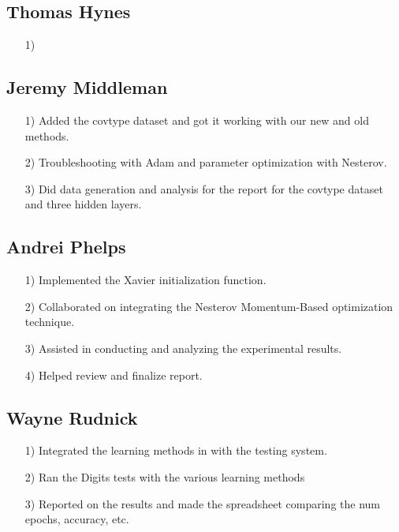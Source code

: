 \documentclass{article}
\begin{document}
\subsection*{Thomas Hynes}
\begin{itemize}
    \item[1)] 
\end{itemize}

\subsection*{Jeremy Middleman}
\begin{itemize}
    \item[1)] Added the covtype dataset and got it working with our new and old methods.
    \item[2)] Troubleshooting with Adam and parameter optimization with Nesterov.
    \item[3)] Did data generation and analysis for the report for the covtype dataset and three hidden layers.
\end{itemize}

\subsection*{Andrei Phelps}
\begin{itemize}
    \item[1)] Implemented the Xavier initialization function.
    \item[2)] Collaborated on integrating the Nesterov Momentum-Based optimization technique.
    \item[3)] Assisted in conducting and analyzing the experimental results.
    \item[4)] Helped review and finalize report.
\end{itemize}

\subsection*{Wayne Rudnick}
\begin{itemize}
    \item[1)] Integrated the learning methods in with the testing system.
    \item[2)] Ran the Digits tests with the various learning methods
     \item[3)] Reported on the results and made the spreadsheet comparing the num epochs, accuracy, etc.
\end{itemize}
\end{document}
